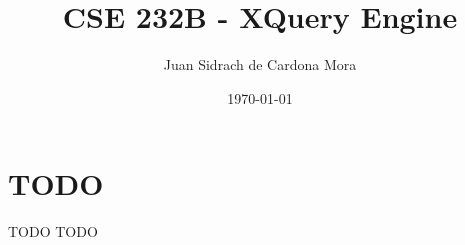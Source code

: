\documentclass{beamer}
\title{CSE 232B - XQuery Engine}
\date{\today}
\author{Juan Sidrach de Cardona Mora}
\institute{University of California, San Diego}
\begin{document}
  \maketitle
  \section{TODO}
  \begin{frame}{TODO}
    TODO
  \end{frame}
\end{document}

